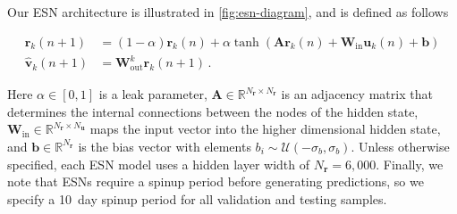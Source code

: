 \documentclass[draft]{agujournal2019}
\newcommand{\state}{\mathbf{v}}
\newcommand{\hidden}{\mathbf{r}}
\newcommand{\inputstate}{\mathbf{u}}
\newcommand{\Wout}{\mathbf{W}_\text{out}}
\newcommand{\localWout}{\Wout^{k}}
\newcommand{\leak}{\alpha}
\newcommand{\adjacency}{\mathbf{A}}
\newcommand{\inputmatrix}{\mathbf{W}_\text{in}}
\newcommand{\bias}{\sigma_{b}}
\newcommand{\biasvector}{\mathbf{b}}
\newcommand{\biasvectorelement}{b}
\newcommand{\localhidden}{\hidden_{k}}
\newcommand{\localinputstate}{\inputstate_{k}}
\newcommand{\localoutput}{\hat{\state}_{k}}
\newcommand{\nhidden}{N_{\hidden}}
\newcommand{\ninputstate}{N_{\inputstate}}
\newcommand{\ngroups}{N_{g}}
\begin{document}
Our ESN architecture is illustrated in \cref{fig:esn-diagram}, and is defined as
follows
\begin{linenomath*}\begin{equation}
    \begin{aligned}
        \localhidden(n+1)
        &=
        \left(1-\leak\right)\localhidden(n)
        +
        \leak \tanh\left(
            \adjacency \localhidden(n) + \inputmatrix \localinputstate(n) + \biasvector
            \right)
             \\
        \localoutput(n+1)
        &= \localWout \localhidden(n+1) \, .
    \end{aligned}
    \label{eq:rc}
\end{equation}\end{linenomath*}
Here
$\leak\in[0,1]$ is a leak parameter,
$\adjacency \in \mathbb{R}^{\nhidden\times\nhidden}$ is an adjacency matrix that
determines the internal connections between the nodes of the hidden state,
$\inputmatrix \in \mathbb{R}^{\nhidden\times\ninputstate}$ maps the input vector
into the higher dimensional hidden state,
and $\biasvector\in\mathbb{R}^{\nhidden}$
is the bias vector with elements
$\biasvectorelement_i \sim \mathcal{U}(-\bias,\bias)$.
Unless otherwise specified, each ESN model uses a hidden layer width of
$\nhidden=6,000$.
Finally, we note that ESNs require a spinup period before generating
predictions, so we specify a 10~day spinup period for all validation and testing
samples.
\end{document}
